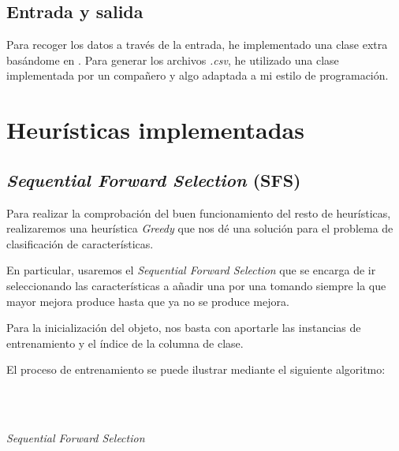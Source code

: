 \documentclass[a4paper, 11pt]{article}
\begin{document}
		\subsection{Entrada y salida}
			Para recoger los datos a través de la entrada, he implementado una clase extra basándome
			en \cite{ARFFReader}.
			Para generar los archivos \textit{.csv}, he utilizado una clase implementada por un
			compañero y algo adaptada a mi estilo de programación.

	\section{Heurísticas implementadas}
		\subsection{\textit{Sequential Forward Selection} (\textbf{SFS})}
			Para realizar la comprobación del buen funcionamiento del resto de heurísticas, realizaremos
			una heurística \textit{Greedy} que nos dé una solución para el problema de clasificación
			de características.
			
			En particular, usaremos el \textit{Sequential Forward Selection} que se encarga de ir
			seleccionando las características a añadir una por una tomando siempre la que mayor mejora
			produce hasta que ya no se produce mejora.
			
			Para la inicialización del objeto, nos basta con aportarle las instancias de entrenamiento
			y el índice de la columna de clase.
			
			El proceso de entrenamiento se puede ilustrar mediante el siguiente algoritmo:

			\begin{algorithm}[H]
				\begin{algorithmic}[1]
					\REQUIRE \ \\
							 \

							\ENDIF
							
							\ENDIF
						\ENDFOR
						
						\ELSE
						\ENDIF
					\ENDWHILE
				\end{algorithmic}
			\caption{\textit{Sequential Forward Selection}}
			\label{SFS}
			\end{algorithm}			
\end{document}
